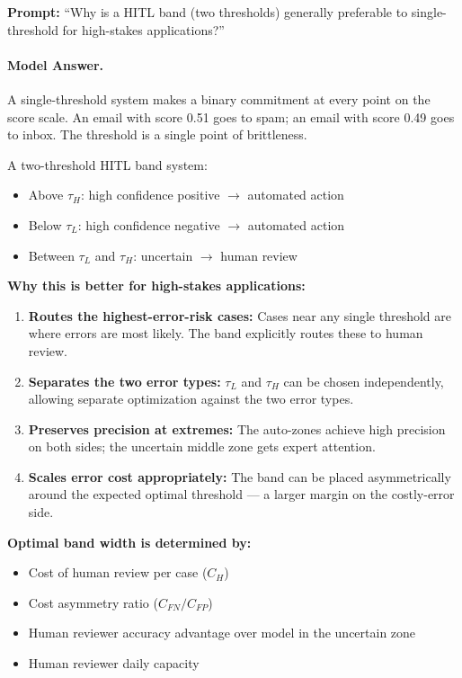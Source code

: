 \textbf{Prompt:} ``Why is a HITL band (two thresholds) generally preferable to single-threshold for high-stakes applications?''

\paragraph{Model Answer.}

A single-threshold system makes a binary commitment at every point on the score scale. An email with score 0.51 goes to spam; an email with score 0.49 goes to inbox. The threshold is a single point of brittleness.

A two-threshold HITL band system:
\begin{itemize}
    \item Above $\tau_H$: high confidence positive $\to$ automated action
    \item Below $\tau_L$: high confidence negative $\to$ automated action
    \item Between $\tau_L$ and $\tau_H$: uncertain $\to$ human review
\end{itemize}

\textbf{Why this is better for high-stakes applications:}

\begin{enumerate}
    \item \textbf{Routes the highest-error-risk cases:} Cases near any single threshold are where errors are most likely. The band explicitly routes these to human review.

    \item \textbf{Separates the two error types:} $\tau_L$ and $\tau_H$ can be chosen independently, allowing separate optimization against the two error types.

    \item \textbf{Preserves precision at extremes:} The auto-zones achieve high precision on both sides; the uncertain middle zone gets expert attention.

    \item \textbf{Scales error cost appropriately:} The band can be placed asymmetrically around the expected optimal threshold --- a larger margin on the costly-error side.
\end{enumerate}

\textbf{Optimal band width is determined by:}
\begin{itemize}
    \item Cost of human review per case ($C_H$)
    \item Cost asymmetry ratio ($C_{FN}/C_{FP}$)
    \item Human reviewer accuracy advantage over model in the uncertain zone
    \item Human reviewer daily capacity
\end{itemize}

